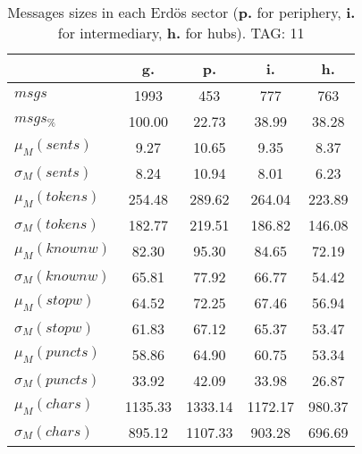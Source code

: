 \begin{table}[h!]
\begin{center}
\begin{tabular}{| l | c | c | c | c |}\hline
 & g. & p. & i. & h. \\\hline
$msgs$ & 1993  & 453  & 777  & 763 \\\hline
$msgs_{\%}$ & 100.00  & 22.73  & 38.99  & 38.28 \\\hline
$\mu_M(sents)$ & 9.27  & 10.65  & 9.35  & 8.37 \\\hline
$\sigma_M(sents)$ & 8.24  & 10.94  & 8.01  & 6.23 \\\hline
$\mu_M(tokens)$ & 254.48  & 289.62  & 264.04  & 223.89 \\\hline
$\sigma_M(tokens)$ & 182.77  & 219.51  & 186.82  & 146.08 \\\hline
$\mu_M(knownw)$ & 82.30  & 95.30  & 84.65  & 72.19 \\\hline
$\sigma_M(knownw)$ & 65.81  & 77.92  & 66.77  & 54.42 \\\hline
$\mu_M(stopw)$ & 64.52  & 72.25  & 67.46  & 56.94 \\\hline
$\sigma_M(stopw)$ & 61.83  & 67.12  & 65.37  & 53.47 \\\hline
$\mu_M(puncts)$ & 58.86  & 64.90  & 60.75  & 53.34 \\\hline
$\sigma_M(puncts)$ & 33.92  & 42.09  & 33.98  & 26.87 \\\hline
$\mu_M(chars)$ & 1135.33  & 1333.14  & 1172.17  & 980.37 \\\hline
$\sigma_M(chars)$ & 895.12  & 1107.33  & 903.28  & 696.69 \\\hline
\end{tabular}
\caption{Messages sizes in each Erd\"os sector ({{\bf p.}} for periphery, {{\bf i.}} for intermediary, {{\bf h.}} for hubs). TAG: 11}
\end{center}
\end{table}